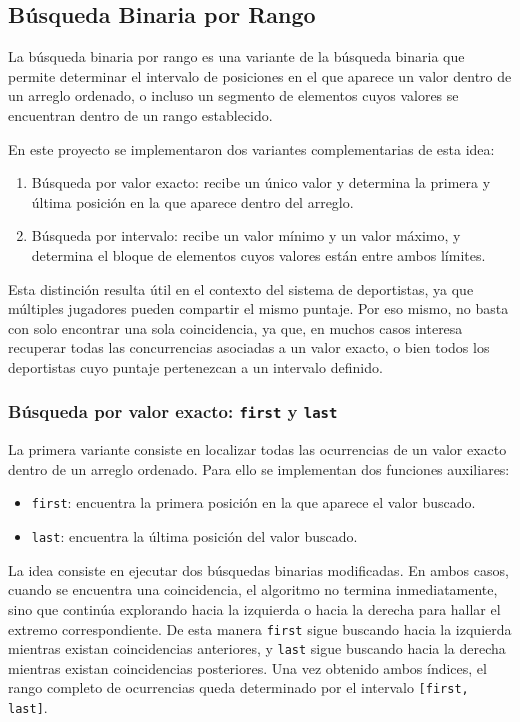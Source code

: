 \subsection{Búsqueda Binaria por Rango}\label{sec:binario-rango}
La búsqueda binaria por rango es una variante de la búsqueda binaria que permite determinar el intervalo de posiciones en el que aparece un valor dentro de un arreglo ordenado, o incluso un segmento de elementos cuyos valores se encuentran dentro de un rango establecido.

En este proyecto se implementaron dos variantes complementarias de esta idea:
\begin{enumerate}
    \item Búsqueda por valor exacto: recibe un único valor y determina la primera y última posición en la que aparece dentro del arreglo.
    \item Búsqueda por intervalo: recibe un valor mínimo y un valor máximo, y determina el bloque de elementos cuyos valores están entre ambos límites.
\end{enumerate}
Esta distinción resulta útil en el contexto del sistema de deportistas, ya que múltiples jugadores pueden compartir el mismo puntaje. Por eso mismo, no basta con solo encontrar una sola coincidencia, ya que, en muchos casos interesa recuperar todas las concurrencias asociadas a un valor exacto, o bien todos los deportistas cuyo puntaje pertenezcan a un intervalo definido.

\subsubsection{Búsqueda por valor exacto: \texttt{first} y \texttt{last}}
La primera variante consiste en localizar todas las ocurrencias de un valor exacto dentro de un arreglo ordenado. Para ello se implementan dos funciones auxiliares:
\begin{itemize}
    \item \texttt{first}: encuentra la primera posición en la que aparece el valor buscado.
    \item \texttt{last}: encuentra la última posición del valor buscado.
\end{itemize}

La idea consiste en ejecutar dos búsquedas binarias modificadas. En ambos casos, cuando se encuentra una coincidencia, el algoritmo no termina inmediatamente, sino que continúa explorando hacia la izquierda o hacia la derecha para hallar el extremo correspondiente. De esta manera \texttt{first} sigue buscando hacia la izquierda mientras existan coincidencias anteriores, y \texttt{last} sigue buscando hacia la derecha mientras existan coincidencias posteriores. Una vez obtenido ambos índices, el rango completo de ocurrencias queda determinado por el intervalo \texttt{[first, last]}.

